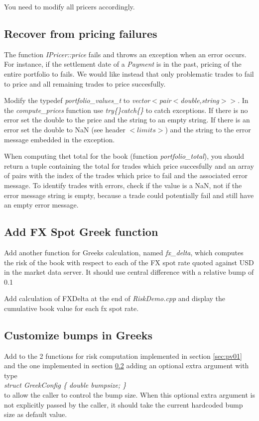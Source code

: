 \documentclass[10pt]{article}
\begin{document}
You need to modify all pricers accordingly.

\subsection{Recover from pricing failures}
The function \textit{IPricer::price} fails and throws an exception when an error occurs. For instance, if the settlement date of a \textit{Payment} is in the past, pricing of the entire portfolio to fails. We would like instead that only problematic trades to fail to price and all remaining trades to price succesfully.

Modify the typedef \textit{portfolio\_values\_t} to \textit{vector$<$pair$<$double,string$>>$}. In the \textit{compute\_prices} function use \textit{try\{\}catch\{\}} to catch exceptions. If there is no error set the double to the price and the string to an empty string. If there is an error set the double to NaN (see header $<limits>$) and the string to the error message embedded in the exception.

When computing thet total for the book (function \textit{portfolio\_total}), you should return a tuple containing the total for trades which price succesfully and an array of pairs with the index of the trades which price to fail and the associated error message. To identify trades with errors, check if the value is a NaN, not if the error message string is empty, because a trade could potentially fail and still have an empty error message.

\subsection{Add FX Spot Greek function}
\label{sec:fxdelta}
Add another function for Greeks calculation, named \textit{fx\_delta}, which computes the risk of the book with respect to each of the FX spot rate quoted against USD in the market data server. It should use central difference with a relative bump of 0.1%

Add calculation of FXDelta at the end of \textit{RiskDemo.cpp} and display the cumulative book value for each fx spot rate.

\subsection{Customize bumps in Greeks}

Add to the 2 functions for risk computation implemented in section \ref{sec:pv01} and the one implemented in section \ref{sec:fxdelta} adding an optional extra argument with type\\
\textit{struct GreekConfig \{ double bumpsize; \}}\\
to allow the caller to control the bump size. When this optional extra argument is not explicitly passed by the caller, it should take the current hardcoded bump size as default value.
\end{document}
